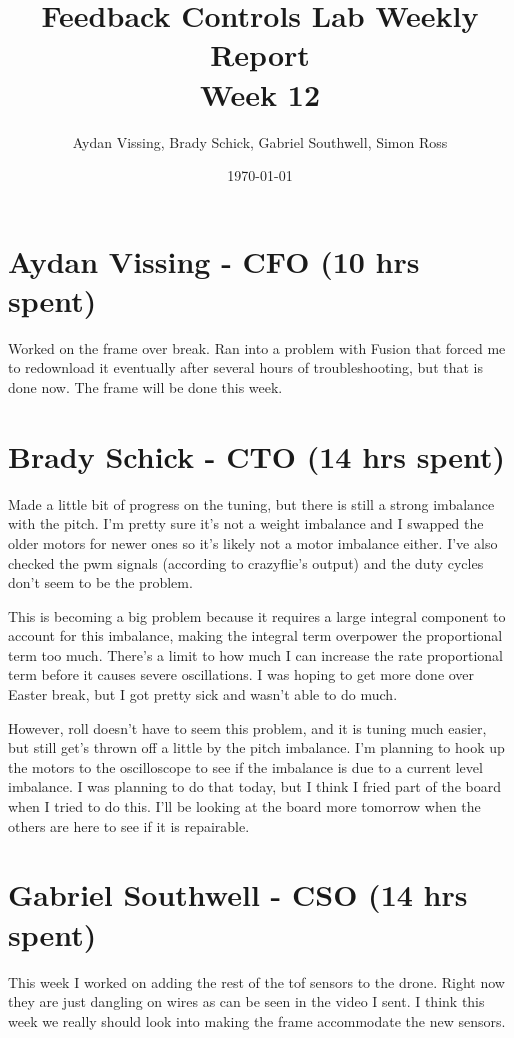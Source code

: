 \documentclass[12pt, titlepage]{article}
\title{Feedback Controls Lab Weekly Report \\ \normalsize{Week 12}}
\author{Aydan Vissing, Brady Schick, Gabriel Southwell, Simon Ross}
\date{\today}
\begin{document}
\maketitle

\section*{Aydan Vissing - CFO (10 hrs spent)}

Worked on the frame over break. Ran into a problem with Fusion that forced me to redownload it eventually after several hours of troubleshooting, but that is done now. The frame will be done this week. 

\section*{Brady Schick - CTO (14 hrs spent)}

Made a little bit of progress on the tuning, but there is still a strong imbalance with the pitch. I'm pretty sure it's not a weight imbalance and I swapped the older motors for newer ones so it's likely not a motor imbalance either. I've also checked the pwm signals (according to crazyflie's output) and the duty cycles don't seem to be the problem.

This is becoming a big problem because it requires a large integral component to account for this imbalance, making the integral term overpower the proportional term too much. There's a limit to how much I can increase the rate proportional term before it causes severe oscillations. I was hoping to get more done over Easter break, but I got pretty sick and wasn't able to do much.

However, roll doesn't have to seem this problem, and it is tuning much easier, but still get's thrown off a little by the pitch imbalance. I'm planning to hook up the motors to the oscilloscope to see if the imbalance is due to a current level imbalance. I was planning to do that today, but I think I fried part of the board when I tried to do this. I'll be looking at the board more tomorrow when the others are here to see if it is repairable.

\section*{Gabriel Southwell - CSO (14 hrs spent)}

This week I worked on adding the rest of the tof sensors to the drone. Right now they are just dangling on wires as can be seen in the video I sent. I think this week we really should look into making the frame accommodate the new sensors.
\end{document}
